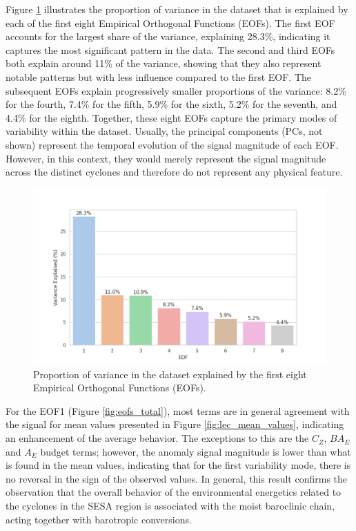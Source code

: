 Figure \ref{fig:variance_explained} illustrates the proportion of variance in the dataset that is explained by each of the first eight Empirical Orthogonal Functions (EOFs). The first EOF accounts for the largest share of the variance, explaining 28.3\%, indicating it captures the most significant pattern in the data. The second and third EOFs both explain around 11\% of the variance, showing that they also represent notable patterns but with less influence compared to the first EOF. The subsequent EOFs explain progressively smaller proportions of the variance: 8.2\% for the fourth, 7.4\% for the fifth, 5.9\% for the sixth, 5.2\% for the seventh, and 4.4\% for the eighth. Together, these eight EOFs capture the primary modes of variability within the dataset. Usually, the principal components (PCs, not shown) represent the temporal evolution of the signal magnitude of each EOF. However, in this context, they would merely represent the signal magnitude across the distinct cyclones and therefore do not represent any physical feature.

\begin{figure}[!htbp]
\centering
\includegraphics[width=0.9\columnwidth,angle=0]{figs_5/variance_explained.png}
\caption[EOF - Explained Variance]{Proportion of variance in the dataset explained by the first eight Empirical Orthogonal Functions (EOFs).}
\label{fig:variance_explained}
\end{figure}

For the EOF1 (Figure \ref{fig:eofs_total}), most terms are in general agreement with the signal for mean values presented in Figure \ref{fig:lec_mean_values}, indicating an enhancement of the average behavior. The exceptions to this are the $C_Z$, $BA_E$ and $A_E$ budget terms; however, the anomaly signal magnitude is lower than what is found in the mean values, indicating that for the first variability mode, there is no reversal in the sign of the observed values. In general, this result confirms the observation that the overall behavior of the environmental energetics related to the cyclones in the SESA region is associated with the moist baroclinic chain, acting together with barotropic conversions.

